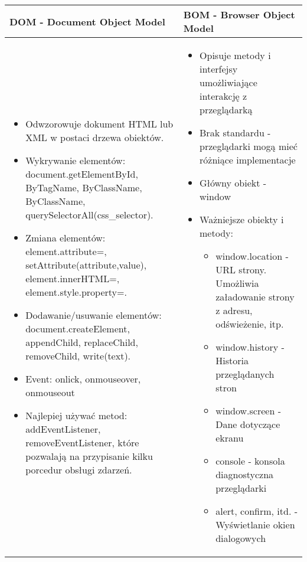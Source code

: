 \documentclass[../main.tex]{subfiles}
\begin{document}
    \begin{table}[H]
        \begin{center}
            \begin{tabular}{| p{8cm} | p{8cm}| }
                \hline
                \textbf{DOM} - Document Object Model &  \textbf{BOM} - Browser Object Model\\
                \hline
                \hline
                \begin{itemize}
                    \item Odwzorowuje dokument HTML lub XML w postaci drzewa obiektów.
                    \item Wykrywanie elementów: document.getElementById, ByTagName, ByClassName, ByClassName, querySelectorAll(css\_selector).
                    \item Zmiana elementów: element.attribute=, setAttribute(attribute,value), element.innerHTML=, element.style.property=.
                    \item Dodawanie/usuwanie elementów: document.createElement, appendChild, replaceChild, removeChild, write(text).
                    \item Event: onlick, onmouseover, onmouseout
                    \item Najlepiej używać metod: addEventListener, removeEventListener, które pozwalają na przypisanie kilku porcedur obsługi zdarzeń.
                \end{itemize}
                &
                \begin{itemize}
                    \item Opisuje metody i interfejsy umożliwiające interakcję z przeglądarką
                    \item Brak standardu - przeglądarki mogą mieć różniące implementacje
                    \item Główny obiekt - window
                    \item Ważniejsze obiekty i metody:
                    \begin{itemize}
                        \item window.location - URL strony. Umożliwia załadowanie strony z adresu, odświeżenie, itp.
                        \item window.history - Historia przeglądanych stron
                        \item window.screen - Dane dotyczące ekranu
                        \item console - konsola diagnostyczna przeglądarki
                        \item alert, confirm, itd. - Wyświetlanie okien dialogowych
                    \end{itemize}
                \end{itemize}
                \\
                \hline
            \end{tabular}
        \end{center}
    \end{table}
\end{document}
